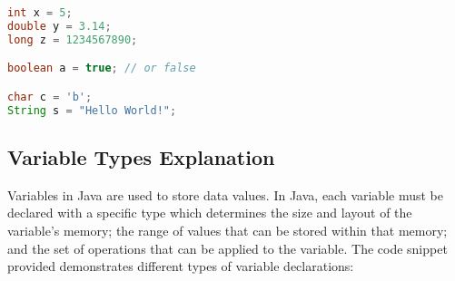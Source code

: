 \documentclass{article}
\begin{document}
\begin{lstlisting}[language=Java]
int x = 5;
double y = 3.14;
long z = 1234567890;

boolean a = true; // or false

char c = 'b';
String s = "Hello World!";
\end{lstlisting}


\subsection{Variable Types Explanation}

Variables in Java are used to store data values. In Java, each variable must be declared with a specific type which determines the size and layout of the variable's memory; the range of values that can be stored within that memory; and the set of operations that can be applied to the variable.
The code snippet provided demonstrates different types of variable declarations:
\end{document}

